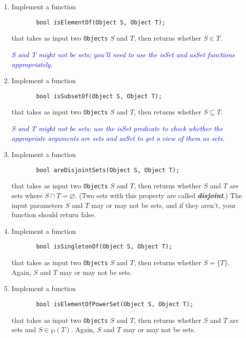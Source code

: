 \documentclass{article}
\renewcommand{\(}{\left(}
\renewcommand{\)}{\right)}
\theoremstyle{plain}
\theoremstyle{plain}
\theoremstyle{definition}
\begin{document}
\begin{enumerate}[label*=\roman*.,ref=\roman*]

\item Implement a function
\begin{verbatim}
       bool isElementOf(Object S, Object T);
\end{verbatim}
that takes as input two \texttt{Objects} $S$ and $T$, then returns whether $S \in T$. 

\textit{\textcolor{blue}{S and T might not be sets; you'll need to use the isSet and asSet functions appropriately.}}

\item Implement a function
\begin{verbatim}
       bool isSubsetOf(Object S, Object T);
\end{verbatim}
that takes as input two \texttt{Objects} $S$ and $T$, then returns whether $S \subseteq T$.

\textit{\textcolor{blue}{S and T might not be sets; use the isSet predicate to check whether the appropriate arguments are sets and asSet to get a view of them as sets.}}

\item Implement a function
\begin{verbatim}
       bool areDisjointSets(Object S, Object T);
\end{verbatim}
that takes as input two \texttt{Objects} $S$ and $T$, then returns whether $S$ and $T$ are sets where $S \cap T = \varnothing$. (Two sets with this property are called \textbf{\textit{disjoint}}.) The input parameters $S$ and $T$ may or may not be sets, and if they aren't, your function should return false.

\item Implement a function
\begin{verbatim}
       bool isSingletonOf(Object S, Object T);
\end{verbatim}
that takes as input two \texttt{Objects} $S$ and $T$, then returns whether $S = \{T\}$. Again, $S$ and $T$ may or may not be sets.

\item Implement a function
\begin{verbatim}
       bool isElementOfPowerSet(Object S, Object T);
\end{verbatim}
that takes as input two \texttt{Objects} $S$ and $T$, then returns whether $S$ and $T$ are sets and $S \in \wp(T)$. Again, $S$ and $T$ may or may not be sets.


\end{enumerate}
\end{document}
